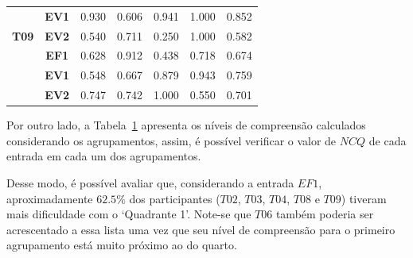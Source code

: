 \begin{table}[htbp]
\begin{tabular}{|ccccccc|}
		\rowcolor[HTML]{F2F2F2} 
		\multicolumn{1}{|c|}{\cellcolor[HTML]{F2F2F2}} & \multicolumn{1}{c|}{\cellcolor[HTML]{F2F2F2}\textbf{EV1}} & \multicolumn{1}{c|}{\cellcolor[HTML]{F2F2F2}0.930} & \multicolumn{1}{c|}{\cellcolor[HTML]{F2F2F2}0.606} & \multicolumn{1}{c|}{\cellcolor[HTML]{F2F2F2}0.941} & \multicolumn{1}{c|}{\cellcolor[HTML]{F2F2F2}1.000} & 0.852 \\ \cline{2-7} 
		\multicolumn{1}{|c|}{\multirow{-3}{*}{\cellcolor[HTML]{F2F2F2}\textbf{T09}}} & \multicolumn{1}{c|}{\textbf{EV2}} & \multicolumn{1}{c|}{0.540} & \multicolumn{1}{c|}{0.711} & \multicolumn{1}{c|}{0.250} & \multicolumn{1}{c|}{1.000} & 0.582 \\ \hline
		\rowcolor[HTML]{F2F2F2} 
		\multicolumn{1}{|c|}{\cellcolor[HTML]{F2F2F2}} & \multicolumn{1}{c|}{\cellcolor[HTML]{F2F2F2}\textbf{EF1}} & \multicolumn{1}{c|}{\cellcolor[HTML]{F2F2F2}0.628} & \multicolumn{1}{c|}{\cellcolor[HTML]{F2F2F2}0.912} & \multicolumn{1}{c|}{\cellcolor[HTML]{F2F2F2}0.438} & \multicolumn{1}{c|}{\cellcolor[HTML]{F2F2F2}0.718} & 0.674 \\ \cline{2-7} 
		\multicolumn{1}{|c|}{\cellcolor[HTML]{F2F2F2}} & \multicolumn{1}{c|}{\textbf{EV1}} & \multicolumn{1}{c|}{0.548} & \multicolumn{1}{c|}{0.667} & \multicolumn{1}{c|}{0.879} & \multicolumn{1}{c|}{0.943} & 0.759 \\ \cline{2-7} 
		\rowcolor[HTML]{F2F2F2} 
		\multicolumn{1}{|c|}{\multirow{-3}{*}{\cellcolor[HTML]{F2F2F2}\textbf{T10}}} & \multicolumn{1}{c|}{\cellcolor[HTML]{F2F2F2}\textbf{EV2}} & \multicolumn{1}{c|}{\cellcolor[HTML]{F2F2F2}0.747} & \multicolumn{1}{c|}{\cellcolor[HTML]{F2F2F2}0.742} & \multicolumn{1}{c|}{\cellcolor[HTML]{F2F2F2}1.000} & \multicolumn{1}{c|}{\cellcolor[HTML]{F2F2F2}0.550} & 0.701 \\ \hline
	\end{tabular}
	\label{tab:F3A1_NC_entradas_comagrupamento}
\end{table}

Por outro lado, a Tabela~\ref{tab:F3A1_NC_entradas_comagrupamento} apresenta os níveis de compreensão calculados considerando os agrupamentos, assim, é possível verificar o valor de $NCQ$ de cada entrada em cada um dos agrupamentos.

Desse modo, é possível avaliar que, considerando a entrada $EF1$, aproximadamente $62.5\%$ dos participantes ($T02$, $T03$, $T04$, $T08$ e $T09$) tiveram mais dificuldade com o `Quadrante 1'. Note-se que $T06$ também poderia ser acrescentado a essa lista uma vez que seu nível de compreensão para o primeiro agrupamento está muito próximo ao do quarto. 

